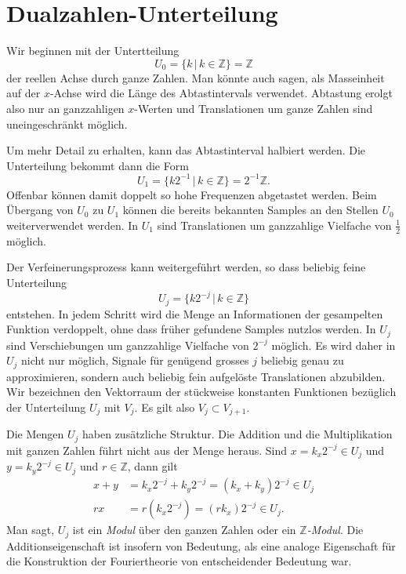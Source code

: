 %
%
%
\section{Dualzahlen-Unterteilung%
\label{section:dualzahlen}}
Wir beginnen mit der Untertteilung
\[
U_0
=
\{ k\,|\, k\in\mathbb Z\}
=
\mathbb Z
\]
der reellen Achse durch ganze Zahlen.
Man könnte auch sagen, als Masseinheit auf der $x$-Achse wird die
Länge des Abtastintervals verwendet.
Abtastung erolgt also nur an ganzzahligen $x$-Werten und
Translationen um ganze Zahlen sind uneingeschränkt möglich.

Um mehr Detail zu erhalten, kann das Abtastinterval halbiert werden.
Die Unterteilung bekommt dann die Form
\[
U_1
=
\{ k2^{-1}\,|\, k\in\mathbb Z\}
=
2^{-1}\mathbb Z.
\]
Offenbar können damit doppelt so hohe Frequenzen abgetastet werden.
Beim Übergang von $U_0$ zu $U_1$ können die bereits bekannten Samples
an den Stellen $U_0$ weiterverwendet werden.
In $U_1$ sind Translationen um ganzzahlige Vielfache von $\frac12$ 
möglich.

Der Verfeinerungsprozess kann weitergeführt werden, so dass beliebig
feine Unterteilung
\[
U_j = \{ k2^{-j}\,|\,k\in\mathbb Z\}
\]
entstehen.
In jedem Schritt wird die Menge an Informationen der gesampelten Funktion
verdoppelt, ohne dass früher gefundene Samples nutzlos werden.
In $U_j$ sind Verschiebungen um ganzzahlige Vielfache von $2^{-j}$ 
möglich.
Es wird daher in $U_j$ nicht nur möglich, Signale für genügend grosses $j$
beliebig genau zu approximieren, sondern auch beliebig fein aufgelöste
Translationen abzubilden.
Wir bezeichnen den Vektorraum der stückweise konstanten Funktionen
bezüglich der Unterteilung $U_j$ mit $V_j$.
Es gilt also $V_j \subset V_{j+1}$.

Die Mengen $U_j$ haben zusätzliche Struktur.
Die Addition und die Multiplikation mit ganzen Zahlen führt nicht aus
der Menge heraus.
Sind $x=k_x2^{-j}\in U_j$ und $y=k_y2^{-j}\in U_j$ und $r\in\mathbb Z$,
dann gilt
\begin{align*}
x+y &= k_x 2^{-j}+k_y2^{-j}=(k_x+k_y)2^{-j}\in U_j
\\
rx&=r(k_x2^{-j}) = (rk_x)2^{-j}\in U_j.
\end{align*}
Man sagt, $U_j$ ist ein {\em Modul} über den ganzen Zahlen oder ein
{\em $\mathbb Z$-Modul}.
Die Additionseigenschaft ist insofern von Bedeutung, als eine analoge
Eigenschaft für die Konstruktion der Fouriertheorie von entscheidender
Bedeutung war.

